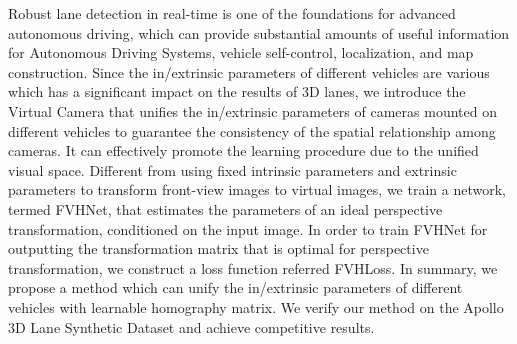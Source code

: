 Robust lane detection in real-time is one of the foundations for advanced autonomous driving,
which can provide substantial amounts of useful information for Autonomous Driving Systems, vehicle self-control, localization, and map construction.
Since the in/extrinsic parameters of different vehicles are various which has a significant impact on the results of 3D lanes,
we introduce the Virtual Camera that unifies the in/extrinsic parameters of cameras mounted on
different vehicles to guarantee the consistency of the spatial relationship among cameras.
It can effectively promote the learning procedure due to the unified visual space.
Different from using fixed intrinsic parameters and extrinsic parameters to transform front-view images to virtual images,
we train a network, termed FVHNet, that estimates the parameters of an ideal perspective transformation, conditioned on the input image.
In order to train FVHNet for outputting the transformation matrix that is optimal for perspective transformation, we construct a loss function referred FVHLoss.
In summary, we propose a method which can unify the in/extrinsic parameters of different vehicles with learnable homography matrix.
We verify our method on the Apollo 3D Lane Synthetic Dataset and achieve competitive results.